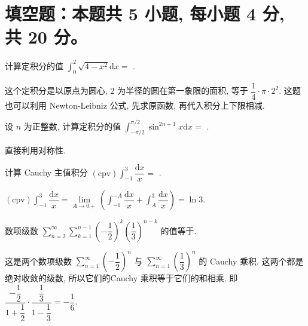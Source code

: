 \section{填空题：本题共 5 小题, 每小题 4 分, 共 20 分。}



\begin{question}
计算定积分的值 $\int_{0}^{2} \sqrt{4 - x^2} \mathrm{d} x = $ \fillin[$\pi$].
\end{question}

\begin{solution}
这个定积分是以原点为圆心, $2$ 为半径的圆在第一象限的面积, 等于 $\dfrac{1}{4} \cdot \pi \cdot 2^2.$ 这题也可以利用 Newton-Leibniz 公式, 先求原函数, 再代入积分上下限相减.
\end{solution}

\begin{question}
设 $n$ 为正整数, 计算定积分的值 $\int_{-\pi/2}^{\pi/2} \sin^{2n+1} x \mathrm{d} x = $ \fillin[$0$].
\end{question}

\begin{solution}
直接利用对称性.
\end{solution}

\begin{question}
计算 Cauchy 主值积分 $(\text{cpv}) \int_{-1}^{3} \dfrac{\mathrm{d}x}{x} = $ \fillin[$\ln 3$].
\end{question}

\begin{solution}
$(\text{cpv}) \int_{-1}^{3} \dfrac{\mathrm{d}x}{x} = \lim\limits_{A \to 0+} \left( \int_{-1}^{-A} \dfrac{\mathrm{d}x}{x} + \int_{A}^{3} \dfrac{\mathrm{d}x}{x} \right) = \ln 3.$
\end{solution}

\begin{question}
数项级数 $\sum\limits_{n=2}^\infty \sum\limits_{k=1}^{n-1} \left(-\dfrac{1}{2}\right)^k \left(\dfrac{1}{3}\right)^{n-k}$ 的值等于\fillin[$-\dfrac{1}{6}$].
\end{question}

\begin{solution}
这是两个数项级数 $\sum\limits_{n=1}^\infty \left(-\dfrac{1}{2}\right)^n$ 与 $\sum\limits_{n=1}^\infty \left(\dfrac{1}{3}\right)^n$ 的 Cauchy 乘积. 这两个都是绝对收敛的级数, 所以它们的Cauchy 乘积等于它们的和相乘, 即 $\dfrac{-\dfrac{1}{2}}{1 + \dfrac{1}{2}} \cdot \dfrac{\dfrac{1}{3}}{1 - \dfrac{1}{3}} = -\dfrac{1}{6}.$
\end{solution}

